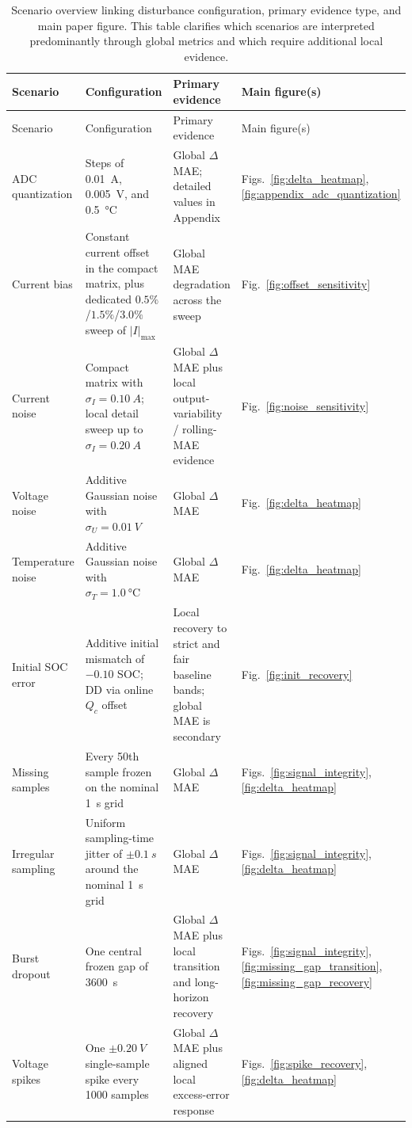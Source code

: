 \documentclass[review]{elsarticle}
\begin{document}
\small
\begin{longtable}{p{2.3cm}p{3.0cm}p{4.0cm}p{1.7cm}}
\caption{Scenario overview linking disturbance configuration, primary evidence type, and main paper figure. This table clarifies which scenarios are interpreted predominantly through global metrics and which require additional local evidence.}\label{tab:appendix_scenario_overview}\\
\toprule
Scenario & Configuration & Primary evidence & Main figure(s) \\
\midrule
\endfirsthead
\toprule
Scenario & Configuration & Primary evidence & Main figure(s) \\
\midrule
\endhead
ADC quantization & Steps of \SI{0.01}{A}, \SI{0.005}{V}, and \SI{0.5}{\celsius} & Global $\Delta$MAE; detailed values in Appendix & Figs.~\ref{fig:delta_heatmap}, \ref{fig:appendix_adc_quantization} \\
Current bias & Constant current offset in the compact matrix, plus dedicated $0.5\%$/$1.5\%$/$3.0\%$ sweep of $|I|_{\max}$ & Global MAE degradation across the sweep & Fig.~\ref{fig:offset_sensitivity} \\
Current noise & Compact matrix with $\sigma_I=\SI{0.10}{A}$; local detail sweep up to $\sigma_I=\SI{0.20}{A}$ & Global $\Delta$MAE plus local output-variability / rolling-MAE evidence & Fig.~\ref{fig:noise_sensitivity} \\
Voltage noise & Additive Gaussian noise with $\sigma_U=\SI{0.01}{V}$ & Global $\Delta$MAE & Fig.~\ref{fig:delta_heatmap} \\
Temperature noise & Additive Gaussian noise with $\sigma_T=\SI{1.0}{\celsius}$ & Global $\Delta$MAE & Fig.~\ref{fig:delta_heatmap} \\
Initial SOC error & Additive initial mismatch of $-0.10$ SOC; DD via online $Q_c$ offset & Local recovery to strict and fair baseline bands; global MAE is secondary & Fig.~\ref{fig:init_recovery} \\
Missing samples & Every 50th sample frozen on the nominal \SI{1}{s} grid & Global $\Delta$MAE & Figs.~\ref{fig:signal_integrity}, \ref{fig:delta_heatmap} \\
Irregular sampling & Uniform sampling-time jitter of $\pm\SI{0.1}{s}$ around the nominal \SI{1}{s} grid & Global $\Delta$MAE & Figs.~\ref{fig:signal_integrity}, \ref{fig:delta_heatmap} \\
Burst dropout & One central frozen gap of \SI{3600}{s} & Global $\Delta$MAE plus local transition and long-horizon recovery & Figs.~\ref{fig:signal_integrity}, \ref{fig:missing_gap_transition}, \ref{fig:missing_gap_recovery} \\
Voltage spikes & One $\pm\SI{0.20}{V}$ single-sample spike every 1000 samples & Global $\Delta$MAE plus aligned local excess-error response & Figs.~\ref{fig:spike_recovery}, \ref{fig:delta_heatmap} \\
\bottomrule
\end{longtable}
\normalsize
\end{document}
